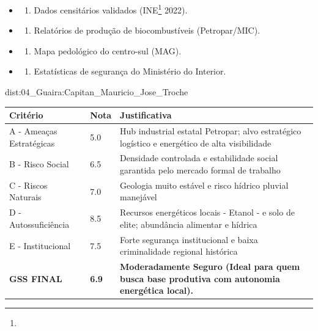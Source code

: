 {\begin{itemize}
\tightlist
\item
  \begin{enumerate}
  \def\labelenumi{\arabic{enumi})}
  \tightlist
  \item
    Dados censitários validados (INE\footnote{\fineINE} 2022).
  \end{enumerate}
\item
  \begin{enumerate}
  \def\labelenumi{\arabic{enumi})}
  \setcounter{enumi}{1}
  \tightlist
  \item
    Relatórios de produção de biocombustíveis (Petropar/\allowbreak MIC).
  \end{enumerate}
\item
  \begin{enumerate}
  \def\labelenumi{\arabic{enumi})}
  \setcounter{enumi}{2}
  \tightlist
  \item
    Mapa pedológico do centro-sul (MAG).
  \end{enumerate}
\item
  \begin{enumerate}
  \def\labelenumi{\arabic{enumi})}
  \setcounter{enumi}{3}
  \tightlist
  \item
    Estatísticas de segurança do Ministério do Interior.
  \end{enumerate}
\end{itemize}}{dist:04_Guaira:Capitan_Mauricio_Jose_Troche}
\begin{table}[ht!]
\small \begin{tabular}{p{3.0cm}p{0.8cm}p{6.0cm}} \toprule
\textbf{Critério} & \textbf{Nota} & \textbf{Justificativa} \\ \midrule
A - Ameaças Estratégicas & 5.0 & Hub industrial estatal Petropar; alvo estratégico logístico e energético de alta visibilidade \\
B - Risco Social & 6.5 & Densidade controlada e estabilidade social garantida pelo mercado formal de trabalho \\
C - Riscos Naturais & 7.0 & Geologia muito estável e risco hídrico pluvial manejável \\
D - Autossuficiência & 8.5 & Recursos energéticos locais - Etanol - e solo de elite; abundância alimentar e hídrica \\
E - Institucional & 7.5 & Forte segurança institucional e baixa criminalidade regional histórica \\
\midrule \textbf{GSS FINAL} & \textbf{6.9} & \textbf{Moderadamente Seguro (Ideal para quem busca base produtiva com autonomia energética local).} \\ \bottomrule \end{tabular}
\end{table}
